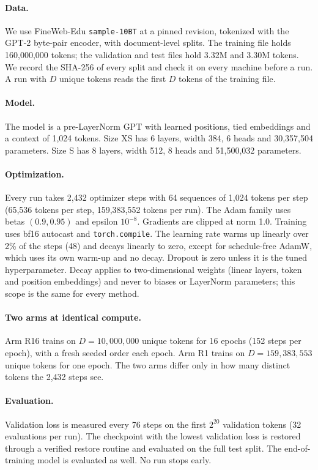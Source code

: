 \documentclass[twoside,11pt]{article}
\begin{document}
\paragraph{Data.}
We use FineWeb-Edu \texttt{sample-10BT} \citep{penedo2024fineweb} at a pinned revision, tokenized with the GPT-2 byte-pair encoder, with document-level splits. The training file holds 160,000,000 tokens; the validation and test files hold 3.32M and 3.30M tokens. We record the SHA-256 of every split and check it on every machine before a run. A run with $D$ unique tokens reads the first $D$ tokens of the training file.

\paragraph{Model.}
The model is a pre-LayerNorm GPT with learned positions, tied embeddings and a context of 1,024 tokens. Size XS has 6 layers, width 384, 6 heads and 30,357,504 parameters. Size S has 8 layers, width 512, 8 heads and 51,500,032 parameters.

\paragraph{Optimization.}
Every run takes 2,432 optimizer steps with 64 sequences of 1,024 tokens per step (65,536 tokens per step, 159,383,552 tokens per run). The Adam family \citep{kingma2015adam} uses betas $(0.9, 0.95)$ and epsilon $10^{-8}$. Gradients are clipped at norm 1.0. Training uses bf16 autocast and \texttt{torch.compile}. The learning rate warms up linearly over 2\% of the steps (48) and decays linearly to zero, except for schedule-free AdamW, which uses its own warm-up and no decay. Dropout is zero unless it is the tuned hyperparameter. Decay applies to two-dimensional weights (linear layers, token and position embeddings) and never to biases or LayerNorm parameters; this scope is the same for every method.

\paragraph{Two arms at identical compute.}
Arm R16 trains on $D = 10{,}000{,}000$ unique tokens for 16 epochs (152 steps per epoch), with a fresh seeded order each epoch. Arm R1 trains on $D = 159{,}383{,}553$ unique tokens for one epoch. The two arms differ only in how many distinct tokens the 2,432 steps see.

\paragraph{Evaluation.}
Validation loss is measured every 76 steps on the first $2^{20}$ validation tokens (32 evaluations per run). The checkpoint with the lowest validation loss is restored through a verified restore routine and evaluated on the full test split. The end-of-training model is evaluated as well. No run stops early.
\end{document}
